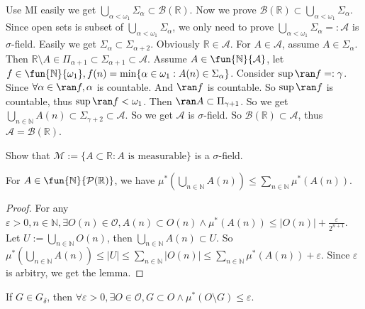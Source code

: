 \documentclass{ctexart}
\begin{document}
\begin{solution}
  Use MI easily we get \(\bigcup_{\alpha < \omega_1} \Sigma_{\alpha} \subset \mathcal{B}(\mathbb{R})\). 
  Now we prove \(\mathcal{B}(\mathbb{R})\subset \bigcup_{\alpha<\omega_1} \Sigma_{\alpha}\). 
  Since open sets is subset of \(\bigcup_{\alpha<\omega_1} \Sigma_{\alpha}\), we only need to prove \(\bigcup_{\alpha<\omega_1} \Sigma_{\alpha}=:\mathcal{A}\) is \(\sigma\)-field. 
  Easily we get \(\Sigma_{\alpha} \subset \Sigma_{\alpha+2}\). 
  Obviously \(\mathbb{R} \in \mathcal{A}\). For \(A \in \mathcal{A}\), assume \(A \in \Sigma_{\alpha}\). 
  Then \(\mathbb{R}\setminus A \in \Pi_{\alpha+1} \subset \Sigma_{\alpha+1}\subset \mathcal{A}\). 
  Assume \(A \in \fun{\mathbb{N}}{\mathcal{A}}\), let \(f \in \fun{\mathbb{N}}{\omega_1},f(n)=\min\{\alpha \in \omega_1:A(n) \in \Sigma_{\alpha}\}\). 
  Consider \(\sup \ran f =:\gamma\). Since \(\forall \alpha \in \ran f,\alpha\) is countable. And \(\ran f\) is countable. 
  So \(\sup \ran f\) is countable, thus \(\sup \ran f <\omega_1\). 
  Then \(\ran A \subset \Pi_{\gamma+1} \). So we get \(\bigcup_{n \in \mathbb{N}} A(n) \subset \Sigma_{\gamma+2} \subset \mathcal{A}\). 
  So we get \(\mathcal{A} \) is \(\sigma\)-field. So \(\mathcal{B}(\mathbb{R}) \subset \mathcal{A}\), thus \(\mathcal{A}=\mathcal{B}(\mathbb{R})\). 
\end{solution}

\begin{problem}
  Show that \(\mathcal{M}:=\{A \subset \mathbb{R}:A \text{ is measurable}\}\) is a \(\sigma\)-field. 
\end{problem}

\begin{lemma}\label{lem:0}
  For \(A \in \fun{\mathbb{N}}{\mathcal{P}(\mathbb{R})}\), we have \(\mu^{*}(\bigcup_{n \in \mathbb{N}} A(n)) \leq \sum_{n \in \mathbb{N}} \mu^{*}(A(n))\). 
\end{lemma}

\begin{proof}
  For any \(\varepsilon>0,n \in \mathbb{N}, \exists O(n) \in \mathcal{O},A(n)\subset O(n) \wedge \mu^{*} (A(n)) \leq |O(n)|+\frac{\varepsilon}{2^{n+1}}\). 
  Let \(U:= \bigcup_{ n \in \mathbb{N}} O(n)\), then \(\bigcup_{ n \in \mathbb{N}} A(n)\subset U\). 
  So \(\mu^{*}(\bigcup_{n \in \mathbb{N}} A(n)) \leq |U| \leq \sum_{n \in \mathbb{N}} |O(n)| \leq \sum_{ n \in \mathbb{N}} \mu ^{*}(A(n))+\varepsilon\). 
  Since \(\varepsilon\) is arbitry, we get the lemma. 
\end{proof}
\begin{lemma}\label{lem:1}
  If \(G \in G_{\delta}\), then \(\forall \varepsilon >0,\exists O \in \mathcal{O},G \subset O \wedge \mu^{*}(O\setminus G)\leq \varepsilon\). 
\end{lemma}
\end{document}
